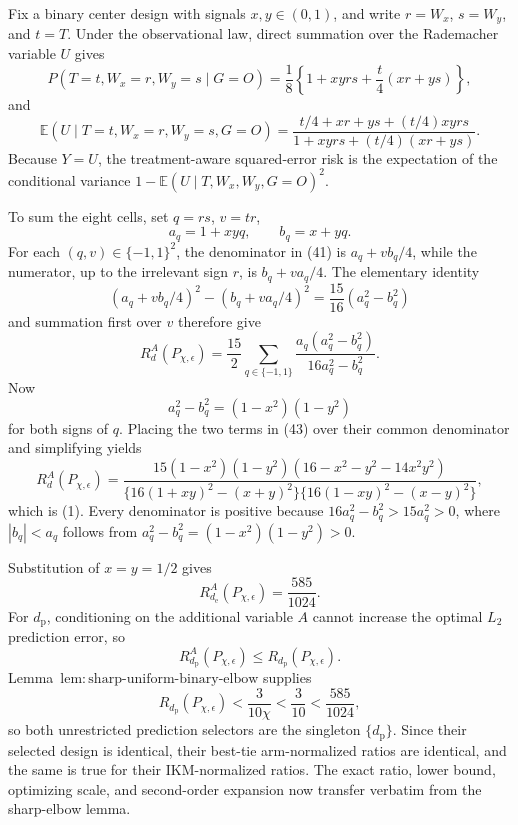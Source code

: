 Fix a binary center design with signals \(x,y\in(0,1)\), and write \(r=W_x\), \(s=W_y\), and \(t=T\).  Under the observational law, direct summation over the Rademacher variable \(U\) gives
\[
 P(T=t,W_x=r,W_y=s\mid G=O)
 =\frac18\left\{1+xyrs+\frac t4(xr+ys)\right\},           \tag{40}
\]
and
\[
 \mathbb E(U\mid T=t,W_x=r,W_y=s,G=O)
 =\frac{t/4+xr+ys+(t/4)xyrs}
 {1+xyrs+(t/4)(xr+ys)}.                                   \tag{41}
\]
Because \(Y=U\), the treatment-aware squared-error risk is the expectation of the conditional variance \(1-\mathbb E(U\mid T,W_x,W_y,G=O)^2\).

To sum the eight cells, set \(q=rs\), \(v=tr\),
\[
 a_q=1+xyq,
 \qquad b_q=x+yq.
\]
For each \((q,v)\in\{-1,1\}^2\), the denominator in (41) is \(a_q+vb_q/4\), while the numerator, up to the irrelevant sign \(r\), is \(b_q+va_q/4\).  The elementary identity
\[
 (a_q+vb_q/4)^2-(b_q+va_q/4)^2
 =\frac{15}{16}(a_q^2-b_q^2)                              \tag{42}
\]
and summation first over \(v\) therefore give
\[
 R_d^A(P_{\chi,\epsilon})
 =\frac{15}{2}\sum_{q\in\{-1,1\}}
 \frac{a_q(a_q^2-b_q^2)}{16a_q^2-b_q^2}.                 \tag{43}
\]
Now
\[
 a_q^2-b_q^2=(1-x^2)(1-y^2)
\]
for both signs of \(q\).  Placing the two terms in (43) over their common denominator and simplifying yields
\[
 R_d^A(P_{\chi,\epsilon})
 =\frac{15(1-x^2)(1-y^2)(16-x^2-y^2-14x^2y^2)}
 {\{16(1+xy)^2-(x+y)^2\}\{16(1-xy)^2-(x-y)^2\}},
\]
which is (1).  Every denominator is positive because \(16a_q^2-b_q^2>15a_q^2>0\), where \(|b_q|<a_q\) follows from \(a_q^2-b_q^2=(1-x^2)(1-y^2)>0\).

Substitution of \(x=y=1/2\) gives
\[
 R_{d_{\mathrm e}}^A(P_{\chi,\epsilon})=\frac{585}{1024}.
\]
For \(d_{\mathrm p}\), conditioning on the additional variable \(A\) cannot increase the optimal \(L_2\) prediction error, so
\[
 R_{d_{\mathrm p}}^A(P_{\chi,\epsilon})
 \le R_{d_{\mathrm p}}(P_{\chi,\epsilon}).
\]
Lemma~\(\mathrm{lem{:}sharp\text{-}uniform\text{-}binary\text{-}elbow}\) supplies
\[
 R_{d_{\mathrm p}}(P_{\chi,\epsilon})
 <\frac3{10\chi}<\frac3{10}<\frac{585}{1024},
\]
so both unrestricted prediction selectors are the singleton \(\{d_{\mathrm p}\}\).  Since their selected design is identical, their best-tie arm-normalized ratios are identical, and the same is true for their IKM-normalized ratios.  The exact ratio, lower bound, optimizing scale, and second-order expansion now transfer verbatim from the sharp-elbow lemma.